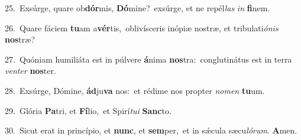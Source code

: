 {\numbfont\textcolor{\numbcolor}{25.}}~Exsúrge, quare ob\-\textbf{dór}\-mis, \textbf{Dó}\-mine?~\star exsúrge, et ne repél\textit{las} \textit{in} \textbf{fi}\-nem.\par
{\numbfont\textcolor{\numbcolor}{26.}}~Quare fáciem \textbf{tu}\-am a\-\textbf{vér}\-tis,~\star oblivísceris inópiæ nostræ, et tribulati\-\textit{ó}\-\textit{nis} \textbf{nos}\-træ?\par
{\numbfont\textcolor{\numbcolor}{27.}}~Quóniam humiliáta est in púlvere \textbf{á}\-nima \textbf{nos}\-tra:~\star conglutinátus est in terra \textit{ven}\-\textit{ter} \textbf{nos}\-ter.\par
{\numbfont\textcolor{\numbcolor}{28.}}~Exsúrge, Dómine, \textbf{ád}\-ju\textbf{va} nos:~\star et rédime nos propter \textit{no}\-\textit{men} \textbf{tu}\-um.\par
{\numbfont\textcolor{\numbcolor}{29.}}~Glória \textbf{Pa}\-tri, et \textbf{Fí}\-lio,~\star et Spirí\-\textit{tu}\-\textit{i} \textbf{Sanc}\-to.\par
{\numbfont\textcolor{\numbcolor}{30.}}~Sicut erat in princípio, et \textbf{nunc}\-, et \textbf{sem}\-per,~\star et in sǽcula sæcu\-\textit{ló}\-\textit{rum}. \textbf{A}\-men.\par
